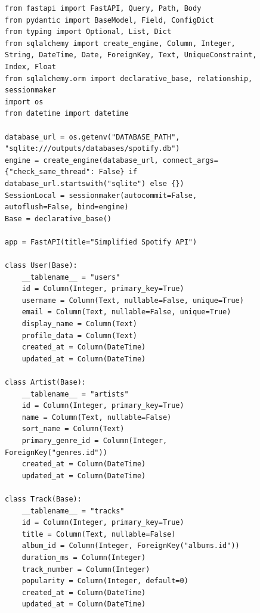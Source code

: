 


\begin{figure}[t]
\centering
\begin{minipage}{0.97\textwidth}
\begin{lstlisting}[style=pythonstyle, firstnumber=1]
from fastapi import FastAPI, Query, Path, Body
from pydantic import BaseModel, Field, ConfigDict
from typing import Optional, List, Dict
from sqlalchemy import create_engine, Column, Integer, String, DateTime, Date, ForeignKey, Text, UniqueConstraint, Index, Float
from sqlalchemy.orm import declarative_base, relationship, sessionmaker
import os
from datetime import datetime

database_url = os.getenv("DATABASE_PATH", "sqlite:///outputs/databases/spotify.db")
engine = create_engine(database_url, connect_args={"check_same_thread": False} if database_url.startswith("sqlite") else {})
SessionLocal = sessionmaker(autocommit=False, autoflush=False, bind=engine)
Base = declarative_base()

app = FastAPI(title="Simplified Spotify API")

class User(Base):
    __tablename__ = "users"
    id = Column(Integer, primary_key=True)
    username = Column(Text, nullable=False, unique=True)
    email = Column(Text, nullable=False, unique=True)
    display_name = Column(Text)
    profile_data = Column(Text)
    created_at = Column(DateTime)
    updated_at = Column(DateTime)

class Artist(Base):
    __tablename__ = "artists"
    id = Column(Integer, primary_key=True)
    name = Column(Text, nullable=False)
    sort_name = Column(Text)
    primary_genre_id = Column(Integer, ForeignKey("genres.id"))
    created_at = Column(DateTime)
    updated_at = Column(DateTime)

class Track(Base):
    __tablename__ = "tracks"
    id = Column(Integer, primary_key=True)
    title = Column(Text, nullable=False)
    album_id = Column(Integer, ForeignKey("albums.id"))
    duration_ms = Column(Integer)
    track_number = Column(Integer)
    popularity = Column(Integer, default=0)
    created_at = Column(DateTime)
    updated_at = Column(DateTime)


\end{lstlisting}
\end{minipage}
\end{figure}
